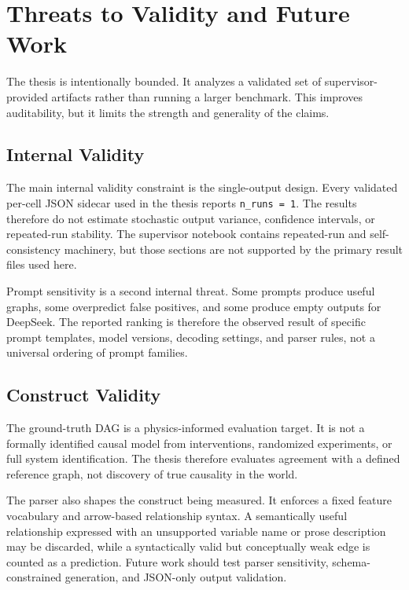 \section{Threats to Validity and Future Work}
\label{sec:limitations}

The thesis is intentionally bounded. It analyzes a validated set of
supervisor-provided artifacts rather than running a larger benchmark. This
improves auditability, but it limits the strength and generality of the
claims.

\subsection{Internal Validity}

The main internal validity constraint is the single-output design. Every
validated per-cell JSON sidecar used in the thesis reports \texttt{n\_runs =
1}. The results therefore do not estimate stochastic output variance,
confidence intervals, or repeated-run stability. The supervisor notebook
contains repeated-run and self-consistency machinery, but those sections are
not supported by the primary result files used here.

Prompt sensitivity is a second internal threat. Some prompts produce useful
graphs, some overpredict false positives, and some produce empty outputs for
DeepSeek. The reported ranking is therefore the observed result of specific
prompt templates, model versions, decoding settings, and parser rules, not a
universal ordering of prompt families.

\subsection{Construct Validity}

The ground-truth DAG is a physics-informed evaluation target. It is not a
formally identified causal model from interventions, randomized experiments,
or full system identification. The thesis therefore evaluates agreement with a
defined reference graph, not discovery of true causality in the world.

The parser also shapes the construct being measured. It enforces a fixed
feature vocabulary and arrow-based relationship syntax. A semantically useful
relationship expressed with an unsupported variable name or prose description
may be discarded, while a syntactically valid but conceptually weak edge is
counted as a prediction. Future work should test parser sensitivity,
schema-constrained generation, and JSON-only output validation.

